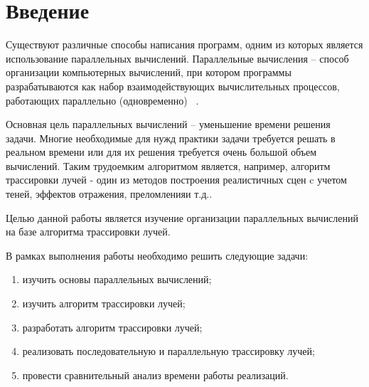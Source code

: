 \chapter*{Введение}

Существуют различные способы написания программ, одним из которых является использование параллельных вычислений. Параллельные вычисления – способ организации компьютерных вычислений, при котором программы разрабатываются как набор взаимодействующих вычислительных процессов, работающих параллельно (одновременно) ~\cite{first_article}. 

Основная цель параллельных вычислений – уменьшение времени
решения задачи. Многие необходимые для нужд практики задачи требуется решать в реальном времени или для их решения требуется очень большой объем вычислений. Таким трудоемким алгоритмом является, например, алгоритм трассировки лучей - один из методов построения реалистичных сцен c учетом теней, эффектов отражения, преломленияи т.д..

Целью данной работы является изучение организации параллельных вычислений на базе алгоритма трассировки лучей.


В рамках выполнения работы необходимо решить следующие задачи: 
\begin{enumerate}[label={\arabic*)}]
	\item изучить основы параллельных вычислений;
	\item изучить алгоритм трассировки лучей;
	\item разработать алгоритм трассировки лучей;
	\item реализовать последовательную и параллельную трассировку лучей;
	\item провести сравнительный анализ времени работы реализаций.
\end{enumerate}
